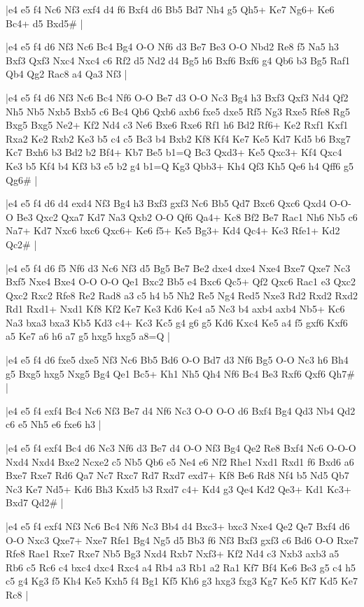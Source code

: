\whitename{}
\blackname{}
\makegametitle
|e4 e5 f4 Nc6 Nf3 exf4 d4 f6 Bxf4 d6 Bb5 Bd7 Nh4 g5 Qh5+ Ke7 Ng6+ Ke6 Bc4+ d5 Bxd5\#  |

\whitename{}
\blackname{}
\makegametitle
|e4 e5 f4 d6 Nf3 Nc6 Bc4 Bg4 O-O Nf6 d3 Be7 Be3 O-O Nbd2 Re8 f5 Na5 h3 Bxf3 Qxf3 Nxc4 Nxc4 c6 Rf2 d5 Nd2 d4 Bg5 h6 Bxf6 Bxf6 g4 Qb6 b3 Bg5 Raf1 Qb4 Qg2 Rac8 a4 Qa3 Nf3  |

\whitename{}
\blackname{}
\makegametitle
|e4 e5 f4 d6 Nf3 Nc6 Bc4 Nf6 O-O Be7 d3 O-O Nc3 Bg4 h3 Bxf3 Qxf3 Nd4 Qf2 Nh5 Nb5 Nxb5 Bxb5 c6 Bc4 Qb6 Qxb6 axb6 fxe5 dxe5 Rf5 Ng3 Rxe5 Rfe8 Rg5 Bxg5 Bxg5 Ne2+ Kf2 Nd4 c3 Ne6 Bxe6 Rxe6 Rf1 h6 Bd2 Rf6+ Ke2 Rxf1 Kxf1 Rxa2 Ke2 Rxb2 Ke3 b5 c4 c5 Bc3 b4 Bxb2 Kf8 Kf4 Ke7 Ke5 Kd7 Kd5 b6 Bxg7 Kc7 Bxh6 b3 Bd2 b2 Bf4+ Kb7 Be5 b1=Q Bc3 Qxd3+ Ke5 Qxc3+ Kf4 Qxc4 Ke3 b5 Kf4 b4 Kf3 b3 e5 b2 g4 b1=Q Kg3 Qbb3+ Kh4 Qf3 Kh5 Qe6 h4 Qff6 g5 Qg6\#  |

\whitename{}
\blackname{}
\makegametitle
|e4 e5 f4 d6 d4 exd4 Nf3 Bg4 h3 Bxf3 gxf3 Nc6 Bb5 Qd7 Bxc6 Qxc6 Qxd4 O-O-O Be3 Qxc2 Qxa7 Kd7 Na3 Qxb2 O-O Qf6 Qa4+ Kc8 Bf2 Be7 Rac1 Nh6 Nb5 c6 Na7+ Kd7 Nxc6 bxc6 Qxc6+ Ke6 f5+ Ke5 Bg3+ Kd4 Qc4+ Ke3 Rfe1+ Kd2 Qc2\#  |

\whitename{}
\blackname{}
\makegametitle
|e4 e5 f4 d6 f5 Nf6 d3 Nc6 Nf3 d5 Bg5 Be7 Be2 dxe4 dxe4 Nxe4 Bxe7 Qxe7 Nc3 Bxf5 Nxe4 Bxe4 O-O O-O Qe1 Bxc2 Bb5 e4 Bxc6 Qc5+ Qf2 Qxc6 Rac1 e3 Qxc2 Qxc2 Rxc2 Rfe8 Re2 Rad8 a3 c5 h4 b5 Nh2 Re5 Ng4 Red5 Nxe3 Rd2 Rxd2 Rxd2 Rd1 Rxd1+ Nxd1 Kf8 Kf2 Ke7 Ke3 Kd6 Ke4 a5 Nc3 b4 axb4 axb4 Nb5+ Kc6 Na3 bxa3 bxa3 Kb5 Kd3 c4+ Kc3 Kc5 g4 g6 g5 Kd6 Kxc4 Ke5 a4 f5 gxf6 Kxf6 a5 Ke7 a6 h6 a7 g5 hxg5 hxg5 a8=Q  |

\whitename{}
\blackname{}
\makegametitle
|e4 e5 f4 d6 fxe5 dxe5 Nf3 Nc6 Bb5 Bd6 O-O Bd7 d3 Nf6 Bg5 O-O Nc3 h6 Bh4 g5 Bxg5 hxg5 Nxg5 Bg4 Qe1 Bc5+ Kh1 Nh5 Qh4 Nf6 Bc4 Be3 Rxf6 Qxf6 Qh7\#  |

\whitename{}
\blackname{}
\makegametitle
|e4 e5 f4 exf4 Bc4 Nc6 Nf3 Be7 d4 Nf6 Nc3 O-O O-O d6 Bxf4 Bg4 Qd3 Nb4 Qd2 c6 e5 Nh5 e6 fxe6 h3  |

\whitename{}
\blackname{}
\makegametitle
|e4 e5 f4 exf4 Bc4 d6 Nc3 Nf6 d3 Be7 d4 O-O Nf3 Bg4 Qe2 Re8 Bxf4 Nc6 O-O-O Nxd4 Nxd4 Bxe2 Ncxe2 c5 Nb5 Qb6 e5 Ne4 e6 Nf2 Rhe1 Nxd1 Rxd1 f6 Bxd6 a6 Bxe7 Rxe7 Rd6 Qa7 Nc7 Rxc7 Rd7 Rxd7 exd7+ Kf8 Be6 Rd8 Nf4 b5 Nd5 Qb7 Nc3 Ke7 Nd5+ Kd6 Bh3 Kxd5 b3 Rxd7 c4+ Kd4 g3 Qe4 Kd2 Qe3+ Kd1 Kc3+ Bxd7 Qd2\#  |

\whitename{}
\blackname{}
\makegametitle
|e4 e5 f4 exf4 Nf3 Nc6 Bc4 Nf6 Nc3 Bb4 d4 Bxc3+ bxc3 Nxe4 Qe2 Qe7 Bxf4 d6 O-O Nxc3 Qxe7+ Nxe7 Rfe1 Bg4 Ng5 d5 Bb3 f6 Nf3 Bxf3 gxf3 c6 Bd6 O-O Rxe7 Rfe8 Rae1 Rxe7 Rxe7 Nb5 Bg3 Nxd4 Rxb7 Nxf3+ Kf2 Nd4 c3 Nxb3 axb3 a5 Rb6 c5 Rc6 c4 bxc4 dxc4 Rxc4 a4 Rb4 a3 Rb1 a2 Ra1 Kf7 Bf4 Ke6 Be3 g5 c4 h5 c5 g4 Kg3 f5 Kh4 Ke5 Kxh5 f4 Bg1 Kf5 Kh6 g3 hxg3 fxg3 Kg7 Ke5 Kf7 Kd5 Ke7 Rc8  |

